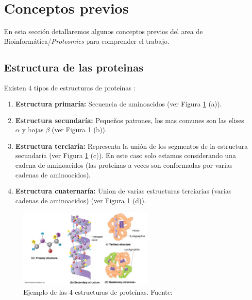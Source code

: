 \documentclass{article}
\begin{document}
	
	\section{Conceptos previos}
	
	En esta sección detallaremos algunos conceptos previos del area de Bioinformática/\textit{Proteomics} para comprender el trabajo.
	
	\subsection{Estructura de las proteinas}
	
	Existen 4 tipos de estructuras de proteínas \citep{russell2002igenetics}:
	
	\begin{enumerate}
		\item \textbf{Estructura primaría:} Secuencia de aminoacidos (ver Figura \ref{fig:protein_structure} (a)).
		\item \textbf{Estructura secundaría:} Pequeños patrones, los mas comunes son las elises $\alpha$ y hojas $\beta$ (ver Figura \ref{fig:protein_structure} (b)).
		\item \textbf{Estructura terciaría:} Representa la unión de los segmentos de la estructura secundaría (ver Figura \ref{fig:protein_structure} (c)). En este caso solo estamos considerando una cadena de aminoacidos (las proteinas a veces son conformadas por varias cadenas de aminoacidos).
		\item \textbf{Estructura cuaternaría:} Union de varias estructuras terciarias (varias cadenas de aminoacidos) (ver Figura \ref{fig:protein_structure} (d)).
	\end{enumerate}
	
	
	\begin{figure}
		\centering
		\includegraphics[width=0.6\textwidth]{img/papers/protein_structure}
		\caption{Ejemplo de las 4 estructuras de proteínas. Fuente: \citep{russell2002igenetics}}
		\label{fig:protein_structure}
	\end{figure}
	
\end{document}

